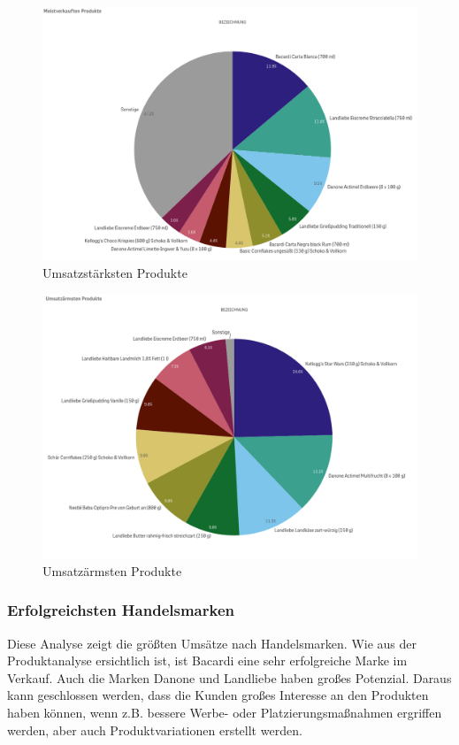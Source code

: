 \begin{figure}[H]
  \centering
  \includegraphics[width=1.2\linewidth]{pictures/meistverkauft_produkt.png}
  \caption{Umsatzstärksten Produkte}
  \label{produkte}
\end{figure}
\begin{figure}[H]
  \centering
  \includegraphics[width=1.2\linewidth]{pictures/umsatzarm.png}
  \caption{Umsatzärmsten Produkte}
  \label{produktearm}
\end{figure}
\subsubsection{Erfolgreichsten Handelsmarken}

Diese Analyse zeigt die größten Umsätze nach Handelsmarken. Wie aus der Produktanalyse ersichtlich ist, ist Bacardi eine sehr erfolgreiche Marke im Verkauf. Auch die Marken Danone und Landliebe haben großes Potenzial. Daraus kann geschlossen werden, dass die Kunden großes Interesse an den Produkten haben können, wenn z.B. bessere Werbe- oder Platzierungsmaßnahmen ergriffen werden, aber auch Produktvariationen erstellt werden.

